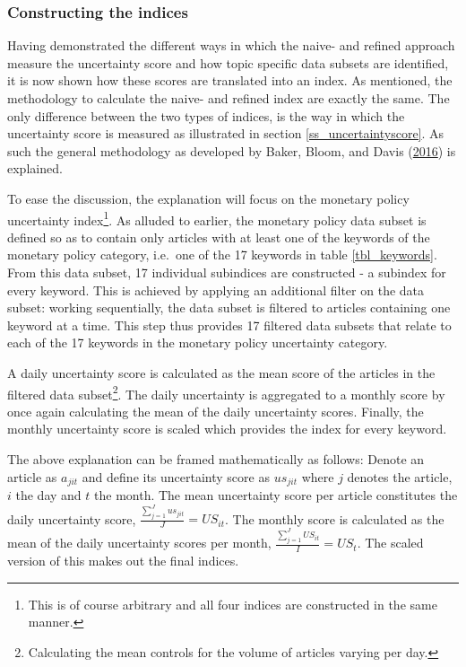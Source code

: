 \documentclass[11pt,preprint, authoryear]{elsarticle}
\numberwithin{equation}{section}
\numberwithin{figure}{section}
\numberwithin{table}{section}
\let\rmarkdownfootnote\footnote%
\def\footnote{\protect\rmarkdownfootnote}
\begin{document}
\subsubsection{\texorpdfstring{Constructing the indices
\label{ss_indices}}{Constructing the indices }}\label{constructing-the-indices}

Having demonstrated the different ways in which the naive- and refined
approach measure the uncertainty score and how topic specific data
subsets are identified, it is now shown how these scores are translated
into an index. As mentioned, the methodology to calculate the naive- and
refined index are exactly the same. The only difference between the two
types of indices, is the way in which the uncertainty score is measured
as illustrated in section \ref{ss_uncertaintyscore}. As such the general
methodology as developed by Baker, Bloom, and Davis
(\protect\hyperlink{ref-Baker2016}{2016}) is explained.

To ease the discussion, the explanation will focus on the monetary
policy uncertainty index\footnote{This is of course arbitrary and all
  four indices are constructed in the same manner.}. As alluded to
earlier, the monetary policy data subset is defined so as to contain
only articles with at least one of the keywords of the monetary policy
category, i.e.~one of the 17 keywords in table \ref{tbl_keywords}. From
this data subset, 17 individual subindices are constructed - a subindex
for every keyword. This is achieved by applying an additional filter on
the data subset: working sequentially, the data subset is filtered to
articles containing one keyword at a time. This step thus provides 17
filtered data subsets that relate to each of the 17 keywords in the
monetary policy uncertainty category.

A daily uncertainty score is calculated as the mean score of the
articles in the filtered data subset\footnote{Calculating the mean
  controls for the volume of articles varying per day.}. The daily
uncertainty is aggregated to a monthly score by once again calculating
the mean of the daily uncertainty scores. Finally, the monthly
uncertainty score is scaled which provides the index for every keyword.

The above explanation can be framed mathematically as follows: Denote an
article as \(a_{jit}\) and define its uncertainty score as \(us_{jit}\)
where \(j\) denotes the article, \(i\) the day and \(t\) the month. The
mean uncertainty score per article constitutes the daily uncertainty
score, \(\frac{\sum_{j=1}^Jus_{jit}}{J}= US_{it}\). The monthly score is
calculated as the mean of the daily uncertainty scores per month,
\(\frac{\sum_{j=1}^JUS_{it}}{I}= US_{t}\). The scaled version of this
makes out the final indices.
\end{document}
